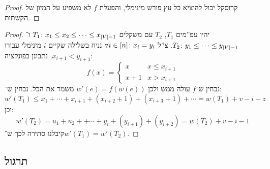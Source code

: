 \documentclass[]{../../../../tex/classes/styledArticle}
\begin{document}
	\begin{proof}
		קרוסקל יכול להוציא כל עץ פורש מינימלי, והפעלת $f$ לא משפיע על המיון של הקשתות. 
	\end{proof}
	\begin{proof}
		יהיו עפ''מים $T_1$, $T_2$ עם משקלים $T_1 \colon x_1 \le x_2 \le \cdots \le x_{\left \lvert V \right \rvert - 1}$ ו־$T_2 \colon y_1 \le \cdots \le y_{\left \lvert V \right \rvert - 1}$. צ''ל $\forall i \in [n] \colon x_i = y_i$ נניח בשלילה שקיים $i$ מינימלי עבורו $x_{i + 1} < y_{i + 1}$. נתבונן בפונקציה: 
		\[ f(x) = \begin{cases}
			x & x \le x_{i + 1} \\
			x + 1 & x > x_{i + 1}
		\end{cases} \]
		נבחין ש־$f$ עולה ממש ולכן $w'(e) = f(w(e))$ משמר את הכל. נבחין ש־: 
		\[ w'(T_1) \le x_1 + \cdots + x_{i + 1} + (x_{i + 2} + 1) + (x_{i +3} + 1) + \cdots = w(T_1) + v - i - z \]
		וכן:
		\[ w'(T_2) = u_1 + u_2 + + \cdots  + y_i + (y_{i + 1}) + (y_{i + 2}) = w(T_2) + v - i - 1 \]
		קיבלנו סתירה לכך ש־$w'(T_1) = w'(T_2)$. 
	\end{proof}
	
	
	\subsection*{תרגול}
	
\end{document}
